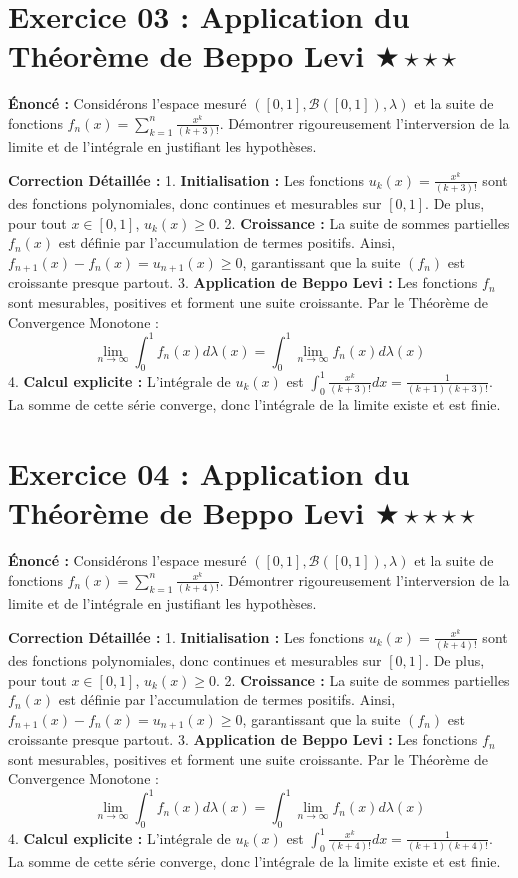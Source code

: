 \documentclass[11pt,a4paper]{article}
\begin{document}
\vspace{1cm}

\section*{Exercice 03 : Application du Théorème de Beppo Levi \quad $\bigstar\star\star\star$}

\textbf{Énoncé :}
Considérons l'espace mesuré $([0, 1], \mathcal{B}([0, 1]), \lambda)$ et la suite de fonctions $f_n(x) = \sum_{k=1}^n \frac{x^k}{(k+3)!}$.
Démontrer rigoureusement l'interversion de la limite et de l'intégrale en justifiant les hypothèses.

\textbf{Correction Détaillée :}
1. \textbf{Initialisation :}
   Les fonctions $u_k(x) = \frac{x^k}{(k+3)!}$ sont des fonctions polynomiales, donc continues et mesurables sur $[0, 1]$. De plus, pour tout $x \in [0, 1]$, $u_k(x) \ge 0$.
2. \textbf{Croissance :}
   La suite de sommes partielles $f_n(x)$ est définie par l'accumulation de termes positifs. Ainsi, $f_{n+1}(x) - f_n(x) = u_{n+1}(x) \ge 0$, garantissant que la suite $(f_n)$ est croissante presque partout.
3. \textbf{Application de Beppo Levi :}
   Les fonctions $f_n$ sont mesurables, positives et forment une suite croissante. Par le Théorème de Convergence Monotone :
   $$\lim_{n \to \infty} \int_0^1 f_n(x) d\lambda(x) = \int_0^1 \lim_{n \to \infty} f_n(x) d\lambda(x)$$
4. \textbf{Calcul explicite :}
   L'intégrale de $u_k(x)$ est $\int_0^1 \frac{x^k}{(k+3)!} dx = \frac{1}{(k+1)(k+3)!}$.
   La somme de cette série converge, donc l'intégrale de la limite existe et est finie.

\vspace{1cm}

\section*{Exercice 04 : Application du Théorème de Beppo Levi \quad $\bigstar\star\star\star\star$}

\textbf{Énoncé :}
Considérons l'espace mesuré $([0, 1], \mathcal{B}([0, 1]), \lambda)$ et la suite de fonctions $f_n(x) = \sum_{k=1}^n \frac{x^k}{(k+4)!}$.
Démontrer rigoureusement l'interversion de la limite et de l'intégrale en justifiant les hypothèses.

\textbf{Correction Détaillée :}
1. \textbf{Initialisation :}
   Les fonctions $u_k(x) = \frac{x^k}{(k+4)!}$ sont des fonctions polynomiales, donc continues et mesurables sur $[0, 1]$. De plus, pour tout $x \in [0, 1]$, $u_k(x) \ge 0$.
2. \textbf{Croissance :}
   La suite de sommes partielles $f_n(x)$ est définie par l'accumulation de termes positifs. Ainsi, $f_{n+1}(x) - f_n(x) = u_{n+1}(x) \ge 0$, garantissant que la suite $(f_n)$ est croissante presque partout.
3. \textbf{Application de Beppo Levi :}
   Les fonctions $f_n$ sont mesurables, positives et forment une suite croissante. Par le Théorème de Convergence Monotone :
   $$\lim_{n \to \infty} \int_0^1 f_n(x) d\lambda(x) = \int_0^1 \lim_{n \to \infty} f_n(x) d\lambda(x)$$
4. \textbf{Calcul explicite :}
   L'intégrale de $u_k(x)$ est $\int_0^1 \frac{x^k}{(k+4)!} dx = \frac{1}{(k+1)(k+4)!}$.
   La somme de cette série converge, donc l'intégrale de la limite existe et est finie.
\end{document}
